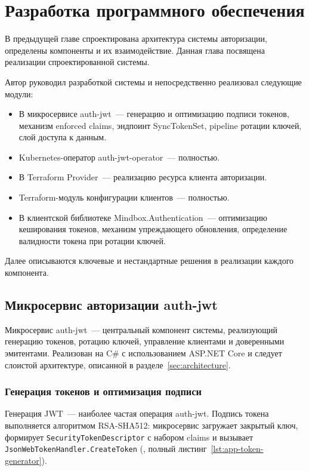 \chapter{Разработка программного обеспечения}\label{ch3}

В предыдущей главе спроектирована архитектура системы авторизации,
определены компоненты и их взаимодействие.
Данная глава посвящена реализации спроектированной системы.

Автор руководил разработкой системы
и непосредственно реализовал следующие модули:
\begin{itemize}
  \item В микросервисе auth-jwt~--- генерацию и оптимизацию подписи токенов,
    механизм enforced claims, эндпоинт SyncTokenSet,
    pipeline ротации ключей, слой доступа к данным.
  \item Kubernetes-оператор auth-jwt-operator~--- полностью.
  \item В Terraform Provider~--- реализацию ресурса клиента авторизации.
  \item Terraform-модуль конфигурации клиентов~--- полностью.
  \item В клиентской библиотеке Mindbox.Authentication~---
    оптимизацию кеширования токенов, механизм упреждающего обновления,
    определение валидности токена при ротации ключей.
\end{itemize}

Далее описываются ключевые и нестандартные решения
в реализации каждого компонента.

\section{Микросервис авторизации auth-jwt}\label{sec:auth-jwt-impl}

Микросервис auth-jwt~--- центральный компонент системы,
реализующий генерацию токенов, ротацию ключей,
управление клиентами и доверенными эмитентами.
Реализован на C\# с использованием ASP.NET Core
и следует слоистой архитектуре, описанной в разделе~\ref{sec:architecture}.

\subsection{Генерация токенов и оптимизация подписи}\label{subsec:token-generation}

Генерация JWT~--- наиболее частая операция auth-jwt.
Подпись токена выполняется алгоритмом RSA-SHA512:
микросервис загружает закрытый ключ,
формирует \texttt{SecurityTokenDescriptor} с набором claims
и вызывает \texttt{JsonWebTokenHandler.CreateToken}
(,
полный листинг~\ref{lst:app-token-generator}).

